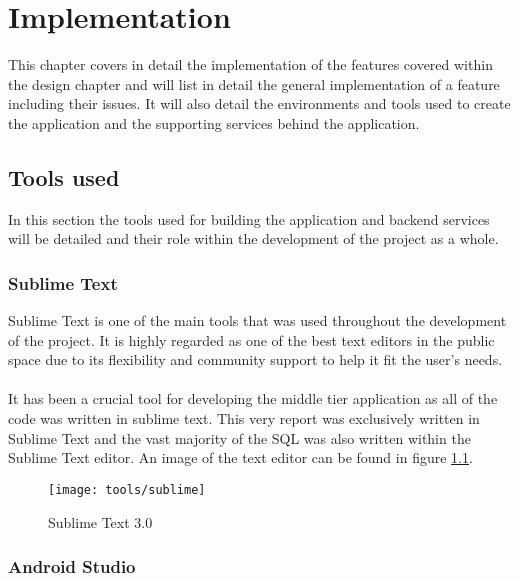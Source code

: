 \chapter{Implementation}

This chapter covers in detail the implementation of the features covered within the design chapter and will list in detail the general implementation of a feature including their issues. It will also detail the environments and tools used to create the application and the supporting services behind the application.

\section{Tools used}

In this section the tools used for building the application and backend services will be detailed and their role within the development of the project as a whole.

\subsection*{Sublime Text}

Sublime Text is one of the main tools that was used throughout the development of the project. It is highly regarded as one of the best text editors in the public space due to its flexibility and community support to help it fit the user's needs.\\
\\
It has been a crucial tool for developing the middle tier application as all of the code was written in sublime text. This very report was exclusively written in Sublime Text and the vast majority of the SQL was also written within the Sublime Text editor. An image of the text editor can be found in figure \ref{fig:sublime_text_image}.

\begin{figure}[H]
    \centering
    \texttt{[image: tools/sublime]}
    \caption{Sublime Text 3.0}
    \label{fig:sublime_text_image}
\end{figure} 

\subsection*{Android Studio}

